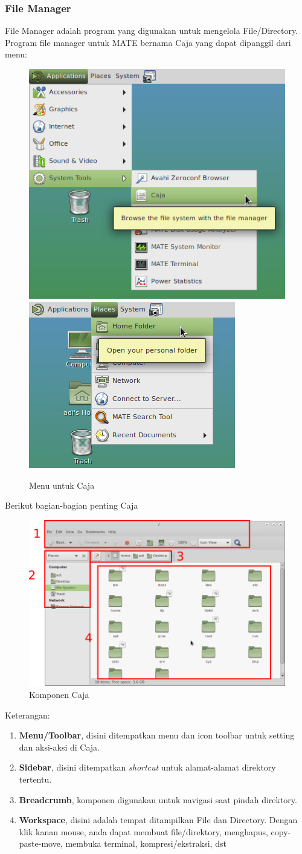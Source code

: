 \documentclass[12pt,]{article}
\begin{document}
	\subsubsection{File Manager}
	
	File Manager adalah program yang digunakan untuk mengelola File/Directory.
	Program file manager untuk MATE bernama Caja yang dapat dipanggil dari menu: 
	\begin{figure}[H]
		\centering
		\includegraphics[width=0.4\linewidth]{images/mateapp/caja1}
		\includegraphics[width=0.4\linewidth]{images/mateapp/caja2}
		\caption{Menu untuk Caja}
	\end{figure} 
	Berikut bagian-bagian penting Caja
	\begin{figure}[H]
		\centering
		\includegraphics[width=0.8\linewidth]{images/mateapp/caja3}
		\caption{Komponen Caja}
	\end{figure} 
	Keterangan:
	\begin{enumerate}
		\item \textbf{Menu/Toolbar}, disini ditempatkan menu dan icon toolbar untuk setting dan aksi-aksi di Caja.
		\item \textbf{Sidebar}, disini ditempatkan \textit{shortcut} untuk alamat-alamat direktory tertentu.
		\item \textbf{Breadcrumb}, komponen digunakan untuk navigasi saat pindah direktory.
		\item \textbf{Workspace}, disini adalah tempat ditampilkan File dan Directory.
		Dengan klik kanan mouse, anda dapat membuat file/direktory, menghapus, copy-paste-move, membuka terminal, kompresi/ekstraksi, dst
	\end{enumerate}
\end{document}
